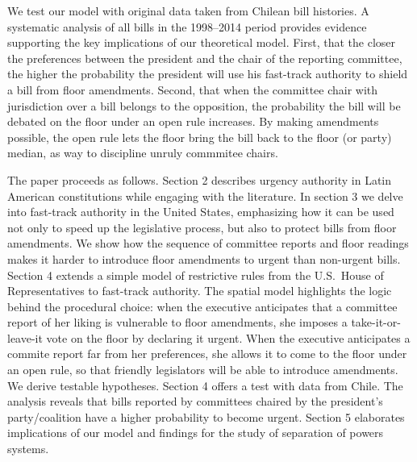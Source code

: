 \documentclass[letter,12pt]{article}
\begin{document}
We test our model with original data taken from Chilean bill histories. A systematic analysis of all bills in the 1998--2014 period provides evidence supporting the key implications of our theoretical model. First, that the closer the preferences between the president and the chair of the reporting committee, the higher the probability the president will use his fast-track authority to shield a bill from floor amendments. Second, that when the committee chair with jurisdiction over a bill belongs to the opposition, the probability the bill will be debated on the floor under an open rule increases. By making amendments possible, the open rule lets the floor bring the bill back to the floor (or party) median, as way to discipline unruly commmitee chairs.

The paper proceeds as follows. Section 2 describes urgency authority in Latin American constitutions while engaging with the literature. In section 3 we delve into fast-track authority in the United States, emphasizing how it can be used not only to speed up the legislative process, but also to protect bills from floor amendments. We show how the sequence of committee reports and floor readings makes it harder to introduce floor amendments to urgent than non-urgent bills. Section 4 extends a simple model of restrictive rules from the U.S.\ House of Representatives to fast-track authority. The spatial model highlights the logic behind the procedural choice: when the executive anticipates that a committee report of her liking is vulnerable to floor amendments, she imposes a take-it-or-leave-it vote on the floor by declaring it urgent. When the executive anticipates a commite report far from her preferences, she allows it to come to the floor under an open rule, so that friendly legislators will be able to introduce amendments. We derive testable hypotheses. Section 4 offers a test with data from Chile. The analysis reveals that bills reported by committees chaired by the president's party/coalition have a higher probability to become urgent. Section 5 elaborates implications of our model and findings for the study of separation of powers systems. 

\end{document}
